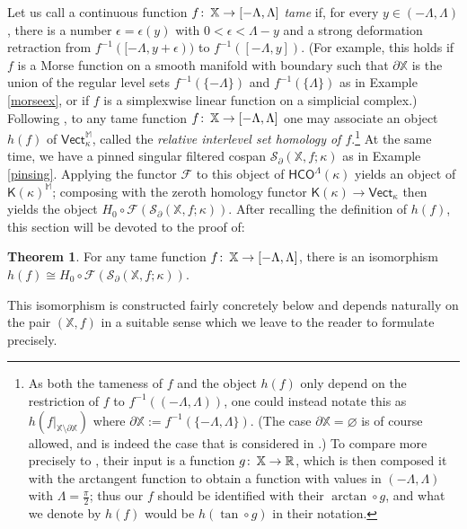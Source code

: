 \documentclass[11pt]{amsart}
\theoremstyle{definition}
\newtheorem{theorem}{Theorem}[section]
\theoremstyle{remark}
\numberwithin{equation}{section}
\def\co{\colon\thinspace}
\def\ep{\epsilon}
\def\R{\mathbb{R}}
\begin{document}
Let us call a continuous function $f\co \mathbb{X}\to [-\Lambda,\Lambda]$ \emph{tame} if, for every $y\in (-\Lambda,\Lambda)$, there is a number $\ep=\ep(y)$ with $0<\ep<\Lambda-y$ and a strong deformation retraction from $f^{-1}([-\Lambda,y+\ep))$ to $f^{-1}([-\Lambda,y])$.  (For example, this holds if $f$ is a Morse function on a smooth manifold with boundary such that $\partial\mathbb{X}$ is the union of the regular level sets $f^{-1}(\{-\Lambda\})$ and $f^{-1}(\{\Lambda\})$ as in Example \ref{morseex}, or if $f$ is a simplexwise linear function on  a simplicial complex.)  Following \cite{BBF20}, to any tame function $f\co \mathbb{X}\to [-\Lambda,\Lambda]$ one may associate an object $h(f)$ of $\mathsf{Vect}_{\kappa}^{\mathbb{M}}$, called the \emph{relative interlevel set homology of $f$}.\footnote{As both the tameness of $f$ and the object $h(f)$ only depend on the restriction of $f$ to $f^{-1}((-\Lambda,\Lambda))$, one could instead notate this as $h(f|_{\mathbb{X}\setminus\partial\mathbb{X}})$ where $\partial\mathbb{X}:=f^{-1}(\{-\Lambda,\Lambda\})$. (The case $\partial\mathbb{X}=\varnothing$ is of course allowed, and is indeed the case that is considered in \cite{BBF20}.) To compare more precisely to \cite{BBF20}, their input is a function $g\co \mathbb{X}\to \R$, which is then composed it with the arctangent function to obtain a function with values in $(-\Lambda,\Lambda)$ with $\Lambda=\frac{\pi}{2}$; thus our $f$ should be identified with their $\arctan\circ g$, and what we denote by $h(f)$ would be $h(\tan\circ g)$ in their notation.}  At the same time,  we have a pinned singular filtered cospan $\mathcal{S}_{\partial}(\mathbb{X},f;\kappa)$ as in Example \ref{pinsing}. Applying the functor $\mathcal{F}$ to this object of $\mathsf{HCO}^{\Lambda}(\kappa)$ yields an object of $\mathsf{K}(\kappa)^{\mathbb{M}}$; composing with the zeroth homology functor $\mathsf{K}(\kappa)\to \mathsf{Vect}_{\kappa}$ then yields the object $H_0\circ \mathcal{F}(\mathcal{S}_{\partial}(\mathbb{X},f;\kappa))$.  After recalling the definition of $h(f)$, this section will be devoted to the proof of:

\begin{theorem} \label{H0iso}
	For any tame function $f\co \mathbb{X}\to [-\Lambda,\Lambda]$, there is an isomorphism $h\left(f\right)\cong H_0\circ \mathcal{F}(\mathcal{S}_{\partial}(\mathbb{X},f;\kappa))$.  
\end{theorem}	

This isomorphism is constructed fairly concretely below and depends naturally on the pair $(\mathbb{X},f)$ in a suitable sense which we leave to the reader to formulate precisely.
  
\end{document}
